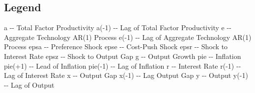 \documentclass{article}%
\begin{document}
\subsection{Legend}%
\label{subsec:Legend}%
a           {-}{-}  Total Factor Productivity\newline%
a({-}1)       {-}{-}  Lag of Total Factor Productivity\newline%
e           {-}{-}  Aggregate Technology AR(1) Process\newline%
e({-}1)       {-}{-}  Lag of Aggregate Technology AR(1) Process\newline%
epsa        {-}{-}  Preference Shock\newline%
epse        {-}{-}  Cost{-}Push Shock\newline%
epsr        {-}{-}  Shock to Interest Rate\newline%
epsz        {-}{-}  Shock to Output Gap\newline%
g           {-}{-}  Output Growth\newline%
pie         {-}{-}  Inflation\newline%
pie(+1)     {-}{-}  Lead of Inflation\newline%
pie({-}1)     {-}{-}  Lag of Inflation\newline%
r           {-}{-}  Interest Rate\newline%
r({-}1)       {-}{-}  Lag of Interest Rate\newline%
x           {-}{-}  Output Gap\newline%
x({-}1)       {-}{-}  Lag Output Gap\newline%
y           {-}{-}  Output\newline%
y({-}1)       {-}{-}  Lag of Output

%
\end{document}
